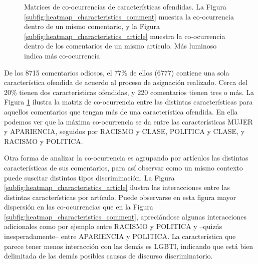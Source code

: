 \begin{figure}[t]
    \caption{Matrices de co-ocurrencias de características ofendidas. La Figura \ref{subfig:heatmap_characteristics_comment} muestra la co-ocurrencia dentro de un mismo comentario, y la Figura \ref{subfig:heatmap_characteristics_article} muestra la co-ocurrencia dentro de los comentarios de un mismo artículo. Más luminoso indica más co-ocurrencia}
    \label{fig:heatmap_characteristics}
\end{figure}


De los \num{8715} comentarios odiosos, el 77\% de ellos (\num{6777}) contiene una sola característica ofendida de acuerdo al proceso de asignación realizado. Cerca del 20\% tienen dos características ofendidas, y 220 comentarios tienen tres o más. La Figura \ref{fig:heatmap_characteristics} ilustra la matriz de co-ocurrencia entre las distintas características para aquellos comentarios que tengan más de una característica ofendida. En ella podemos ver que la máxima co-ocurrencia se da entre las características MUJER y APARIENCIA, seguidos por RACISMO y CLASE, POLITICA y CLASE, y RACISMO y POLITICA.



Otra forma de analizar la co-ocurrencia es agrupando por artículos las distintas características de sus comentarios, para así observar como un mismo contexto puede suscitar distintos tipos discriminación. La Figura \ref{subfig:heatmap_characteristics_article} ilustra las interacciones entre las distintas características por artículo. Puede observarse en esta figura mayor dispersión en las co-ocurrencias que en la Figura \ref{subfig:heatmap_characteristics_comment}, apreciándose algunas interacciones adicionales como por ejemplo entre RACISMO y POLITICA y --quizás inesperadamente-- entre APARIENCIA y POLITICA. La característica que parece tener menos interacción con las demás es LGBTI, indicando que está bien delimitada de las demás posibles causas de discurso discriminatorio.

